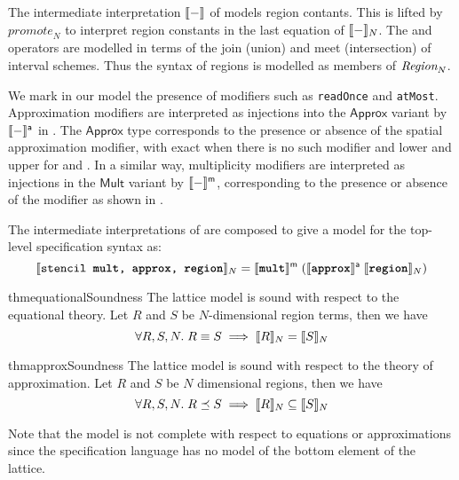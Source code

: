 The intermediate interpretation $\llbracket{} {-} \rrbracket{}$ of
 models region contants. This is lifted by
$\textit{promote}_N$ to interpret region constants in the last
equation of $\llbracket{} {-} \rrbracket{}_N$. The \term{+} and \term{*} operators are
modelled in terms of the join (union) and meet (intersection) of
interval schemes. Thus the syntax of regions is modelled as members of
$\textnormal{$\textit{Region}_{N}$}$.

We mark in our model the presence of modifiers such as
\texttt{readOnce} and \texttt{atMost}.  Approximation modifiers are interpreted as
injections into the $\mathsf{Approx}$ variant by $\llbracket{} {-} \rrbracket{}^{\textsf{a}}$ in
.  The $\textsf{Approx}$ type corresponds
to the presence or absence of the spatial approximation modifier, with
\textsf{exact} when there is no such modifier and \textsf{lower} and
\textsf{upper} for  and . In a similar way,
multiplicity modifiers are interpreted as injections in the
$\mathsf{Mult}$ variant by $\llbracket{} {-} \rrbracket{}^{\textsf{m}}$, corresponding to
the presence or absence of the  modifier as shown in
.

\begin{defn}
The intermediate interpretations of 
are composed to give a model for the top-level specification
syntax as:
%
\begin{equation*}
  \llbracket{} {\texttt{stencil \texttt{\textbf{mult}}, \texttt{\textbf{approx}}, \texttt{\textbf{region}}}} \rrbracket{}_N =
    \llbracket{} {\texttt{\textbf{mult}}} \rrbracket{}^{\textsf{m}} \;
           {(\llbracket{} {\texttt{\textbf{approx}}} \rrbracket{}^{\textsf{a}} \;
                    {\llbracket{} {\texttt{\textbf{region}}} \rrbracket{}_N)}}
\end{equation*}
\end{defn}

\begin{restatable}{thm}{equationalSoundness}
  The lattice model is sound with respect to the equational theory. Let $R$ and $S$
  be $N$-dimensional region terms, then we have
%
  \begin{equation*}
    \forall R, S, N. \; R \equiv S \implies \llbracket{} {R} \rrbracket{}_N = \llbracket{} {S} \rrbracket{}_N
  \end{equation*}
\end{restatable}

\begin{restatable}{thm}{approxSoundness}
  The lattice model is sound with respect to the theory of approximation. Let $R$
  and $S$ be $N$ dimensional regions, then we have
%
  \begin{equation*}
    \forall R, S, N. \; R \preceq S \implies \llbracket{} {R} \rrbracket{}_N \subseteq \llbracket{} {S} \rrbracket{}_N
  \end{equation*}
\end{restatable}
%
Note that the model is not complete with respect to equations or
approximations since the specification language has no model of the
bottom element of the lattice.

